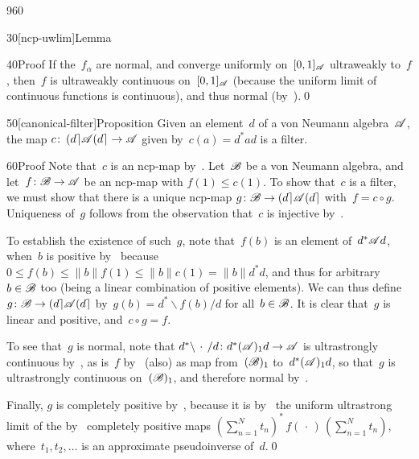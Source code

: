 \begin{parsec}{960}
\begin{point}{30}[ncp-uwlim]{Lemma}
\begin{point}{40}{Proof}
If the~$f_\alpha$ 
are normal,
and converge uniformly on~$[0,1]_{\mathscr{A}}$ ultraweakly
to~$f$,
then~$f$ is ultraweakly continuous
on~$[0,1]_{\mathscr{A}}$
(because the uniform limit of continuous functions is continuous),
and thus normal (by~).\qed
\end{point}
\end{point}
\begin{point}{50}[canonical-filter]{Proposition}%
Given an element~$d$ of a von Neumann algebra~$\mathscr{A}$,
the map $c\colon \left(d\right\rceil\!\mathscr{A}\!\left(d\right\rceil\to\mathscr{A}$
given by~$c(a)=d^*ad$
is a filter.
\begin{point}{60}{Proof}%
Note that~$c$ is an ncp-map by~.
Let~$\mathscr{B}$ be a von Neumann algebra,
and let~$f\colon \mathscr{B}\to\mathscr{A}$ be an ncp-map
with $f(1)\leq c(1)$.
To show that~$c$ is a filter,
we must show that there is a unique ncp-map
$g\colon \mathscr{B}\to
\left(d\right\rceil\!\mathscr{A}\!\left(d\right\rceil$
with~$f=c\circ g$.
Uniqueness of~$g$ follows from the observation
that~$c$ is injective by~.

To establish the existence of such~$g$,
note that~$f(b)$ is an element of~$d^*\mathscr{A} d$,
when~$b$ is positive
by~
because~$0\leq f(b)\leq \|b\|f(1)\leq \|b\| c(1)=\|b\|d^*d$,
and thus for arbitrary~$b\in\mathscr{B}$ too
(being a linear combination
of positive elements).
We can thus define $g\colon \mathscr{B}\to \left(d\right\rceil\!\mathscr{A}\!\left(d\right\rceil$
by~$g(b)=d^*\backslash f(b)/d$
for all~$b\in\mathscr{B}$.
It is clear that~$g$ is linear and positive,
and~$c\circ g=f$.

To see that~$g$ is normal,
note that
$d^*\backslash\,\cdot\,/d\colon
d^*(\mathscr{A})_1 d\to\mathscr{A}$
is ultrastrongly continuous by~,
as is~$f$ by~
(also) as map from~$(\mathscr{B})_1$ to~$d^*(\mathscr{A})_1 d$,
so that~$g$ is ultrastrongly continuous on~$(\mathscr{B})_1$,
and therefore normal by~.

Finally, $g$ is completely positive
by~,
because it is by~
the uniform ultrastrong limit
of the by~ completely positive maps
$(\sum_{n=1}^Nt_n)^* \,f(\,\cdot\,)\,(\sum_{n=1}^N t_n)$,
where~$t_1,t_2,\dotsc$
is an approximate pseudoinverse of~$d$.\qed
\end{point}
\end{point}
\end{parsec}
